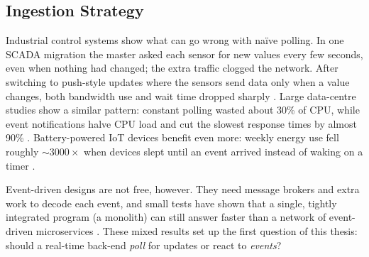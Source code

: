 \documentclass[nomenclature, english, biblatex]{kththesis}
\numberwithin{listing}{chapter}
\begin{document}


\subsection{Ingestion Strategy}
Industrial control systems show what can go wrong with naïve polling. 
In one \gls{SCADA} migration the master asked each sensor for new values every few seconds, even when nothing had changed; the extra traffic clogged the network. 
After switching to push-style updates where the sensors send data only when a value changes, both bandwidth use and wait time dropped sharply \cite{Johansson2021SCADAIaaS}. 
Large data-centre studies show a similar pattern: constant polling wasted about 30\% of CPU, while event notifications halve CPU load and cut the slowest response times by almost 90\% \cite{Lewis2020PowerOfEDA}. 
Battery-powered IoT devices benefit even more: weekly energy use fell roughly \( \sim3000\times \) when devices slept until an event arrived instead of waking on a timer \cite{Makarovi2022EnergyEfficientIoT}.

Event-driven designs are not free, however. 
They need message brokers and extra work to decode each event, and small tests have shown that a single, tightly integrated program (a monolith) can still answer faster than a network of event-driven microservices \cite{Trindade2021EDAImpact}. 
These mixed results set up the first question of this thesis: should a real-time back-end \emph{poll} for updates or react to \emph{events}?
\end{document}

